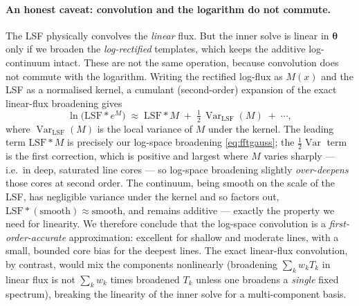 \documentclass[11pt]{article}
\newcommand{\half}{\tfrac{1}{2}}
\newcommand{\Var}{\operatorname{Var}}
\begin{document}
\paragraph{An honest caveat: convolution and the logarithm do not commute.}
The LSF physically convolves the \emph{linear} flux. But the inner solve is linear
in $\boldsymbol\theta$ only if we broaden the \emph{log-rectified} templates,
which keeps the additive log-continuum intact. These are not the same operation,
because convolution does not commute with the logarithm. Writing the rectified
log-flux as $M(x)$ and the LSF as a normalised kernel, a cumulant (second-order)
expansion of the exact linear-flux broadening gives
\begin{equation}
  \ln\!\big(\mathrm{LSF}\!*\!e^{M}\big)
  \;\approx\; \mathrm{LSF}\!*\!M \;+\; \half\,\Var_{\mathrm{LSF}}(M)
  \;+\;\cdots,
  \label{eq:cumulant}
\end{equation}
where $\Var_{\mathrm{LSF}}(M)$ is the local variance of $M$ under the kernel. The
leading term $\mathrm{LSF}\!*\!M$ is precisely our log-space broadening
\eqref{eq:fftgauss}; the $\tfrac12\Var$ term is the first correction, which is
positive and largest where $M$ varies sharply --- i.e.\ in deep, saturated line
cores --- so log-space broadening slightly \emph{over-deepens} those cores at
second order. The continuum, being smooth on the scale of the LSF, has negligible
variance under the kernel and so factors out, $\mathrm{LSF}\!*\!(\text{smooth})
\approx\text{smooth}$, and remains additive --- exactly the property we need for
linearity. We therefore conclude that the log-space convolution is a
\emph{first-order-accurate} approximation: excellent for shallow and moderate
lines, with a small, bounded core bias for the deepest lines. The exact
linear-flux convolution, by contrast, would mix the components nonlinearly
(broadening $\sum_k w_k T_k$ in linear flux is not $\sum_k w_k$ times broadened
$T_k$ unless one broadens a \emph{single} fixed spectrum), breaking the linearity
of the inner solve for a multi-component basis.
\end{document}
